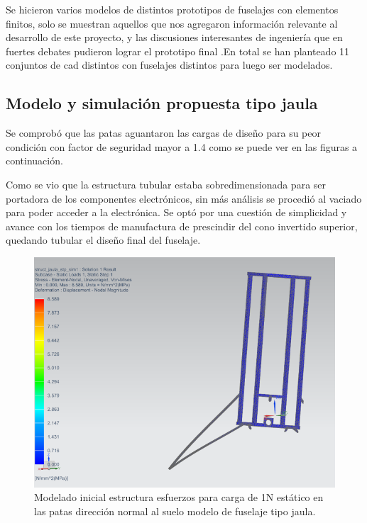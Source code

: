 \medskip

Se hicieron varios modelos de distintos prototipos de fuselajes con elementos finitos, solo se muestran aquellos que nos agregaron información relevante al desarrollo de este proyecto, y las discusiones interesantes de ingeniería que en fuertes debates pudieron lograr el prototipo final .En total se han planteado 11 conjuntos de cad distintos con fuselajes distintos para luego ser modelados.

\null\newpage
\clearpage

\subsection{Modelo y simulación propuesta tipo jaula}
Se comprobó que las patas aguantaron las cargas de diseño para su peor condición con factor de seguridad mayor a 1.4 como se puede ver en las figuras a continuación.

Como se vio que la estructura tubular estaba sobredimensionada para ser portadora de los componentes electrónicos, sin más análisis se procedió al vaciado para poder acceder a la electrónica. Se optó por una cuestión de simplicidad y avance con los tiempos de manufactura de prescindir del cono invertido superior, quedando tubular el diseño final del fuselaje. 



\begin{figure}[htb]
    \centering
    \includegraphics[width=\linewidth]{fig/fea/jaula.png}
    \caption{Modelado inicial estructura esfuerzos para carga de 1N estático en las patas dirección normal al suelo modelo de fuselaje tipo jaula.}
    \label{fig:fea/jaula}
\end{figure}

